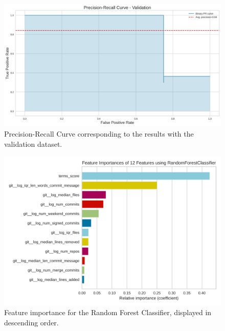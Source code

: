 \documentclass[a4paper, 12pt]{book}
\begin{document}
\begin{figure}
 \centering
  \includegraphics[width=16cm, keepaspectratio]{img/prec-rec-curve-val.png}
  \caption{Precision-Recall Curve corresponding to the results with the validation dataset.}
  \label{fig:prec-rec-val}
\end{figure}

\begin{figure}
 \centering
  \includegraphics[width=16cm, keepaspectratio]{img/rf-feature-importances.png}
  \caption{Feature importance for the Random Forest Classifier, displayed in descending order.}
  \label{fig:rf-feature-importance}
\end{figure}



\end{document}
